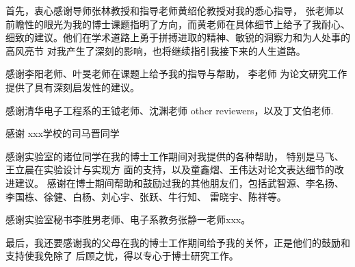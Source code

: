 
\begin{acknowledgements}
  首先，衷心感谢导师张林教授和指导老师黄绍伦教授对我的悉心指导，
  张老师以前瞻性的眼光为我的博士课题指明了方向，而黄老师在具体细节上给予了我耐心、
  细致的建议。他们在学术道路上勇于拼搏进取的精神、敏锐的洞察力和为人处事的高风亮节
  对我产生了深刻的影响，也将继续指引我接下来的人生道路。

  感谢李阳老师、叶旻老师在课题上给予我的指导与帮助，
  李老师 为论文研究工作提供了具有深刻启发性的建议。

  感谢清华电子工程系的王钺老师、沈渊老师 other reviewers，以及丁文伯老师.
  
  感谢 xxx学校的司马晋同学

  感谢实验室的诸位同学在我的博士工作期间对我提供的各种帮助，
  特别是马飞、王立晨在实验设计与实现方 面的支持，以及童鑫熠、王伟达对论文表达细节的改进建议。
  感谢在博士期间帮助和鼓励过我的其他朋友们，包括武智源、李名扬、李国栋、徐健、白杨、刘心宇、张跃、牛行知、
  雷晓宇、陈祥等。

  感谢实验室秘书李胜男老师、电子系教务张静一老师xxx。

  最后，我还要感谢我的父母在我的博士工作期间给予我的关怀，正是他们的鼓励和支持使我免除了
  后顾之忧，得以专心于博士研究工作。
\end{acknowledgements}
